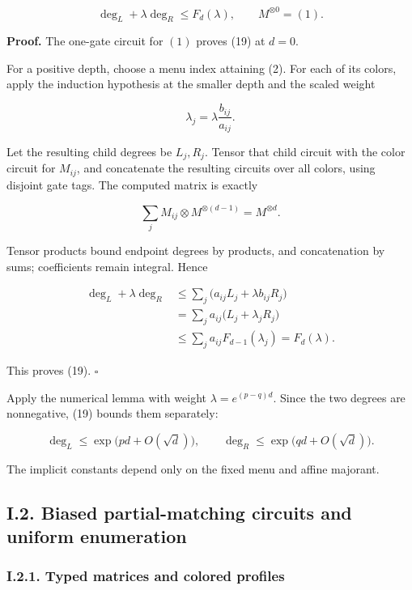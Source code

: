 \[
\deg_L+\lambda\deg_R\leq F_d(\lambda),
\qquad M^{\otimes0}=(1).
\tag{19}
\]

\textbf{Proof.} The one-gate circuit for \((1)\) proves (19) at \(d=0\).

For a positive depth, choose a menu index attaining (2). For each of its colors, apply the induction hypothesis at the smaller depth and the scaled weight

\[
\lambda_j=\lambda\frac{b_{ij}}{a_{ij}}.
\]

Let the resulting child degrees be \(L_j,R_j\). Tensor that child circuit with the color circuit for \(M_{ij}\), and concatenate the resulting circuits over all colors, using disjoint gate tags. The computed matrix is exactly

\[
\sum_j M_{ij}\otimes M^{\otimes(d-1)}
=M^{\otimes d}.
\tag{20}
\]

Tensor products bound endpoint degrees by products, and concatenation by sums; coefficients remain integral. Hence

\[
\begin{aligned}
\deg_L+\lambda\deg_R
&\leq\sum_j\bigl(a_{ij}L_j+\lambda b_{ij}R_j\bigr)\\
&=\sum_j a_{ij}\bigl(L_j+\lambda_jR_j\bigr)\\
&\leq\sum_j a_{ij}F_{d-1}(\lambda_j)
=F_d(\lambda).
\end{aligned}
\tag{21}
\]

This proves (19). \(\square\)

Apply the numerical lemma with weight \(\lambda=e^{(p-q)d}\). Since the two degrees are nonnegative, (19) bounds them separately:

\[
\deg_L\leq\exp\bigl(pd+O(\sqrt d)\bigr),\qquad
\deg_R\leq\exp\bigl(qd+O(\sqrt d)\bigr).
\tag{22}
\]

The implicit constants depend only on the fixed menu and affine majorant.

\hypertarget{af-a9ec399514-i.2.-biased-partial-matching-circuits-and-uniform-enumeration}{%
\subsection{I.2. Biased partial-matching circuits and uniform enumeration}\label{af-a9ec399514-i.2.-biased-partial-matching-circuits-and-uniform-enumeration}}

\hypertarget{af-a9ec399514-i.2.1.-typed-matrices-and-colored-profiles}{%
\subsubsection{I.2.1. Typed matrices and colored profiles}\label{af-a9ec399514-i.2.1.-typed-matrices-and-colored-profiles}}

